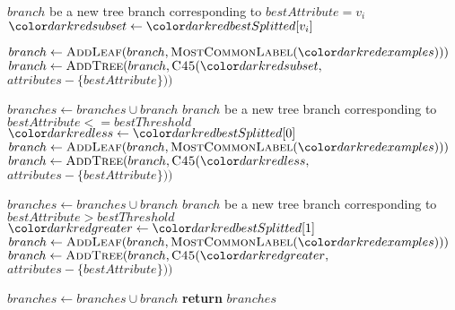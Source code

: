     \begin{algorithm}
    \begin{algorithmic} [1]

           $branch$ {\small be a new tree branch corresponding to} $bestAttribute = v_i$
          \State $\red{subset} \gets \red{bestSplitted}[v_i]$

              \State $branch \gets \textsc{AddLeaf}(branch, \textsc{MostCommonLabel}(\red{examples})))$
          \Else
              \State $branch \gets \textsc{AddTree}(branch, \textsc{C45}(\red{subset},$ $attributes - \{bestAttribute\}))$\par\hfill
          \EndIf
          \State $branches \gets branches \cup branch$
      \EndFor
    \Else
       $branch$ {\small be a new tree branch corresponding to} $bestAttribute <= bestThreshold$
      \State $\red{less} \gets \red{bestSplitted}[0]$
          \State $branch \gets \textsc{AddLeaf}(branch, \textsc{MostCommonLabel}(\red{examples})))$
      \Else
          \State $branch \gets \textsc{AddTree}(branch, \textsc{C45}(\red{less},$ $attributes - \{bestAttribute\}))$\par\hfill
      \EndIf
      \State $branches \gets branches \cup branch$
       $branch$ {\small be a new tree branch corresponding to} $bestAttribute > bestThreshold$
      \State $\red{greater} \gets \red{bestSplitted}[1]$
          \State $branch \gets \textsc{AddLeaf}(branch, \textsc{MostCommonLabel}(\red{examples})))$
      \Else
          \State $branch \gets \textsc{AddTree}(branch, \textsc{C45}(\red{greater},$ $attributes - \{bestAttribute\}))$\par\hfill
      \EndIf
      \State $branches \gets branches \cup branch$
    \EndIf
    \State \textbf{return} $branches$
\EndProcedure
\end{algorithmic}
\end{algorithm}

